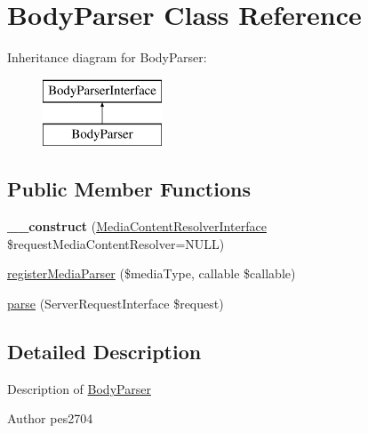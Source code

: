 \hypertarget{class_pes_1_1_http_1_1_body_1_1_body_parser}{}\section{Body\+Parser Class Reference}
\label{class_pes_1_1_http_1_1_body_1_1_body_parser}
Inheritance diagram for Body\+Parser\+:\begin{figure}[H]
\begin{center}
\leavevmode
\includegraphics[height=2.000000cm]{class_pes_1_1_http_1_1_body_1_1_body_parser}
\end{center}
\end{figure}
\subsection*{Public Member Functions}
\begin{DoxyCompactItemize}
\item 
\mbox{\label{class_pes_1_1_http_1_1_body_1_1_body_parser_a4a4b88a924a83a6b552827f4472931f6}} 
{\bfseries \+\_\+\+\_\+construct} (\mbox{\hyperlink{interface_pes_1_1_http_1_1_request_1_1_media_content_resolver_interface}{Media\+Content\+Resolver\+Interface}} \$request\+Media\+Content\+Resolver=N\+U\+LL)
\item 
\mbox{\hyperlink{class_pes_1_1_http_1_1_body_1_1_body_parser_a25bb60104b8414e955c9462104e44743}{register\+Media\+Parser}} (\$media\+Type, callable \$callable)
\item 
\mbox{\hyperlink{class_pes_1_1_http_1_1_body_1_1_body_parser_a60ebb3c19a4dbeebbab0a5c5c7882d53}{parse}} (Server\+Request\+Interface \$request)
\end{DoxyCompactItemize}


\subsection{Detailed Description}
Description of \mbox{\hyperlink{class_pes_1_1_http_1_1_body_1_1_body_parser}{Body\+Parser}}

\begin{DoxyAuthor}{Author}
pes2704 
\end{DoxyAuthor}


